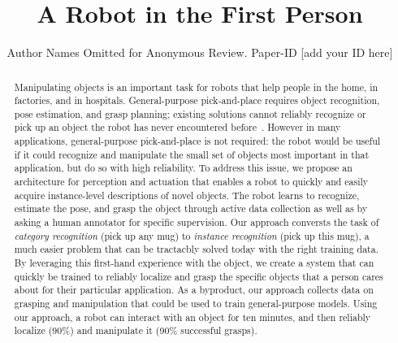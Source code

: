 \documentclass[conference]{IEEEtran}
\begin{document}


\title{A Robot in the First Person}
\author{Author Names Omitted for Anonymous Review. Paper-ID [add your ID here]}

\maketitle


\begin{abstract}
Manipulating objects is an important task for robots that help people
in the home, in factories, and in hospitals.  General-purpose
pick-and-place requires object recognition, pose estimation, and grasp
planning; existing solutions cannot reliably recognize or pick up an
object the robot has never encountered before~\citep{}.  However in
many applications, general-purpose pick-and-place is not required: the
robot would be useful if it could recognize and manipulate the small
set of objects most important in that application, but do so with high
reliability.  To address this issue, we propose an architecture for
perception and actuation that enables a robot to quickly and easily
acquire instance-level descriptions of novel objects.  The robot
learns to recognize, estimate the pose, and grasp the object through
active data collection as well as by asking a human annotator for
specific supervision.  Our approach conversts the task of {\em
  category recognition} (pick up any mug) to {\em instance
  recognition} (pick up this mug), a much easier problem that can be
tractacbly solved today with the right training data.  By leveraging
this first-hand experience with the object, we create a system that
can quickly be trained to reliably localize and grasp the specific
objects that a person cares about for their particular application.
As a byproduct, our approach collects data on grasping and
manipulation that could be used to train general-purpose models. Using
our approach, a robot can interact with an object for ten minutes, and
then reliably localize (90\%) and manipulate it (90\% successful
grasps).


\end{abstract}
\end{document}
